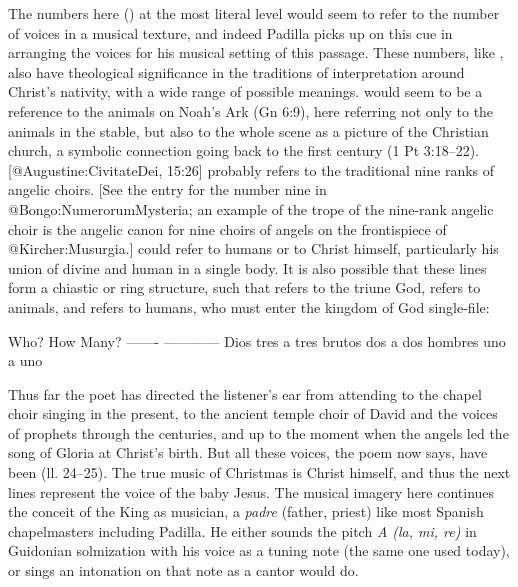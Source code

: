 The numbers here () at the most literal
level would seem to refer to the number of voices in a musical texture, and
indeed Padilla picks up on this cue in arranging the voices for his musical
setting of this passage.
These numbers, like , also have theological significance in
the traditions of interpretation around Christ's nativity, with a wide range of
possible meanings.
 would seem to be a reference to the animals on Noah's Ark (Gn 6:9),
here referring not only to the animals in the stable, but also to the whole
scene as a picture of the Christian church, a symbolic connection going back to
the first century (1 Pt 3:18--22).
[@Augustine:CivitateDei, 15:26]
 probably refers to the traditional nine ranks of angelic choirs.
[See the entry for the number nine in @Bongo:NumerorumMysteria; an example of
the trope of the nine-rank angelic choir is the angelic canon for nine choirs of
angels on the frontispiece of @Kircher:Musurgia.]
 could refer to humans or to Christ himself, particularly his union
of divine and human in a single body.
It is also possible that these lines form a chiastic or ring structure, such
that  refers to the triune God,  refers to animals,
and  refers to humans, who must enter the kingdom of God
single-file:

Who?    How Many?
------- ------------
Dios    tres a tres
brutos  dos a dos
hombres uno a uno

Thus far the poet has directed the listener's ear from attending to the chapel
choir singing in the present, to the ancient temple choir of David and the
voices of prophets through the centuries, and up to the moment when the angels
led the song of Gloria at Christ's birth.
But all these voices, the poem now says, have been  (ll. 24--25).
The true music of Christmas is Christ himself, and thus the next lines represent
the voice of the baby Jesus.
The musical imagery here continues the conceit of the King as musician, a
\emph{padre} (father, priest) like most Spanish chapelmasters including Padilla.
He either sounds the pitch \emph{A (la, mi, re)} in Guidonian solmization with
his voice as a tuning note (the same one used today), or sings an intonation on
that note as a cantor would do.

